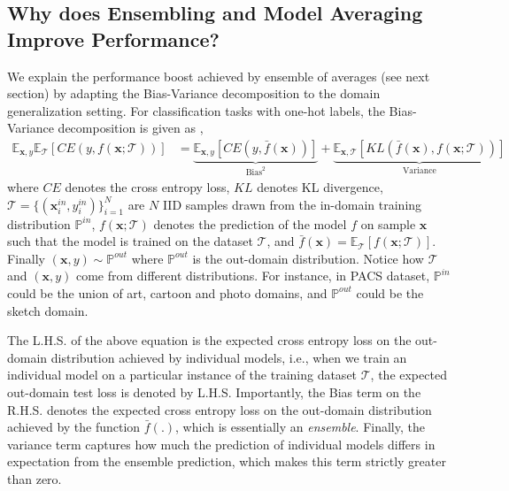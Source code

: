\documentclass{article}
\begin{document}
\subsection{Why does Ensembling and Model Averaging Improve Performance?}
\label{sec_histogram_ablation}
We explain the performance boost achieved by ensemble of averages (see next section) by adapting the Bias-Variance decomposition \cite{geman1992neural} to the domain generalization setting. For classification tasks with one-hot labels, the Bias-Variance decomposition is given as \cite{yang2020rethinking},
\begin{align}
\mathbb{E}_{\mathbf{x}, {y}} \mathbb{E}_{\mathcal{T}} [CE({y}, f(\mathbf{x}; \mathcal{T}))] &=
    \underbrace{\mathbb{E}_{\mathbf{x}, {y}}[CE({y}, \bar{f}(\mathbf{x}))]}_{\text{Bias}^2} + \underbrace{\mathbb{E}_{\mathbf{x},\mathcal{T}}[KL(\bar{f}(\mathbf{x}), f(\mathbf{x}; \mathcal{T}))]}_{\text{Variance}}\nonumber
\end{align}
where $CE$ denotes the cross entropy loss, $KL$ denotes KL divergence, $\mathcal{T} = \{(\mathbf{x}^{in}_i, y^{in}_i)\}_{i=1}^N$ are $N$ IID samples drawn from the in-domain training distribution $\mathbb{P}^{in}$, $f(\mathbf{x}; \mathcal{T})$ denotes the prediction of the model $f$ on sample $\mathbf{x}$ such that the model is trained on the dataset $\mathcal{T}$, and $\bar{f}(\mathbf{x}) = \mathbb{E}_{\mathcal{T}}[f(\mathbf{x}; \mathcal{T})]$. Finally $(\mathbf{x}, y) \sim \mathbb{P}^{out}$ where $\mathbb{P}^{out}$ is the out-domain distribution. Notice how $\mathcal{T}$ and $(\mathbf{x}, y)$ come from different distributions. For instance, in PACS dataset, $\mathbb{P}^{in}$ could be the union of art, cartoon and photo domains, and $\mathbb{P}^{out}$ could be the sketch domain. 

The L.H.S. of the above equation is the expected cross entropy loss on the out-domain distribution achieved by individual models, i.e., when we train an individual model on a particular instance of the training dataset $\mathcal{T}$, the expected out-domain test loss is denoted by L.H.S. Importantly, the Bias term on the R.H.S. denotes the expected cross entropy loss on the out-domain distribution achieved by the function $\bar{f}(.)$, which is essentially an \textit{ensemble}. Finally, the variance term captures how much the prediction of individual models differs in expectation from the ensemble prediction, which makes this term strictly greater than zero. 
\end{document}
